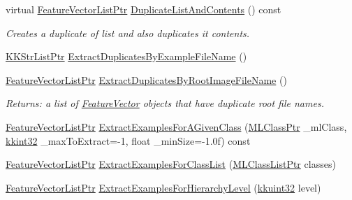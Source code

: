 \begin{DoxyCompactItemize}
virtual \hyperlink{class_k_k_m_l_l_1_1_feature_vector_list_af22f34b214e0dd3b16760002ce392355}{Feature\+Vector\+List\+Ptr} \hyperlink{class_k_k_m_l_l_1_1_feature_vector_list_af14ad0946bbc6de8abdc4b513b6cf859}{Duplicate\+List\+And\+Contents} () const 
\begin{DoxyCompactList}\small\item\em Creates a duplicate of list and also duplicates it contents. \end{DoxyCompactList}\item 
\hyperlink{namespace_k_k_b_a8f5f50672f37857425120831223888aa}{K\+K\+Str\+List\+Ptr} \hyperlink{class_k_k_m_l_l_1_1_feature_vector_list_ac714a6f994a3794e9c807a04ab49cfed}{Extract\+Duplicates\+By\+Example\+File\+Name} ()
\item 
\hyperlink{class_k_k_m_l_l_1_1_feature_vector_list_af22f34b214e0dd3b16760002ce392355}{Feature\+Vector\+List\+Ptr} \hyperlink{class_k_k_m_l_l_1_1_feature_vector_list_a11db98d4fd5c637705539860aa921309}{Extract\+Duplicates\+By\+Root\+Image\+File\+Name} ()
\begin{DoxyCompactList}\small\item\em Returns\+: a list of \textquotesingle{}\hyperlink{class_k_k_m_l_l_1_1_feature_vector}{Feature\+Vector}\textquotesingle{} objects that have duplicate root file names. \end{DoxyCompactList}\item 
\hyperlink{class_k_k_m_l_l_1_1_feature_vector_list_af22f34b214e0dd3b16760002ce392355}{Feature\+Vector\+List\+Ptr} \hyperlink{class_k_k_m_l_l_1_1_feature_vector_list_ab9c72c62046bf92e24e7e635d425792b}{Extract\+Examples\+For\+A\+Given\+Class} (\hyperlink{namespace_k_k_m_l_l_ac272393853d59e72e8456f14cd6d8c23}{M\+L\+Class\+Ptr} \+\_\+ml\+Class, \hyperlink{namespace_k_k_b_a8fa4952cc84fda1de4bec1fbdd8d5b1b}{kkint32} \+\_\+max\+To\+Extract=-\/1, float \+\_\+min\+Size=-\/1.\+0f) const 
\item 
\hyperlink{class_k_k_m_l_l_1_1_feature_vector_list_af22f34b214e0dd3b16760002ce392355}{Feature\+Vector\+List\+Ptr} \hyperlink{class_k_k_m_l_l_1_1_feature_vector_list_aefe3f4ebf6eeff999b291799195b76c0}{Extract\+Examples\+For\+Class\+List} (\hyperlink{namespace_k_k_m_l_l_af091cde3f4a4315658b41a5e7583fc26}{M\+L\+Class\+List\+Ptr} classes)
\item 
\hyperlink{class_k_k_m_l_l_1_1_feature_vector_list_af22f34b214e0dd3b16760002ce392355}{Feature\+Vector\+List\+Ptr} \hyperlink{class_k_k_m_l_l_1_1_feature_vector_list_a6448547dba5f958dde04c5eaf6db1f53}{Extract\+Examples\+For\+Hierarchy\+Level} (\hyperlink{namespace_k_k_b_af8d832f05c54994a1cce25bd5743e19a}{kkuint32} level)

\end{DoxyCompactItemize}
